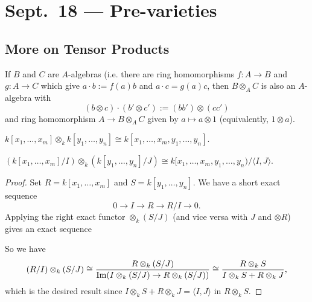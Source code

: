 \chapter{Sept.~18 --- Pre-varieties}

\section{More on Tensor Products}

\begin{prop}
  If $B$ and $C$ are $A$-algebras (i.e.
  there are ring homomorphisms
  $f : A \to B$ and $g : A \to C$ which
  give $a \cdot b := f(a) b$ and
  $a \cdot c = g(a) c$, then
  $B \otimes_A C$ is also an $A$-algebra
  with
  \[
    (b \otimes c) \cdot (b' \otimes c')
    := (bb') \otimes (cc')
  \]
  and ring homomorphism
  $A \to B \otimes_A C$ given by
  $a \mapsto a \otimes 1$ (equivalently,
  $1 \otimes a$).
\end{prop}

\begin{prop}
  $k[x_1, \dots, x_m] \otimes_k k[y_1, \dots, y_n] \cong k[x_1, \dots, x_m, y_1, \dots, y_n]$.
\end{prop}

\begin{prop}
  $(k[x_1, \dots, x_m] / I) \otimes_k (k[y_1, \dots, y_n] / J) \cong k[x_1, \dots, x_m, y_1, \dots, y_n) / \langle I, J \rangle$.
\end{prop}

\begin{proof}
  Set $R = k[x_1, \dots, x_m]$ and
  $S = k[y_1, \dots, y_n]$. We have a
  short exact sequence
  \[
    0 \longrightarrow
    I \longrightarrow R \longrightarrow R / I \longrightarrow 0.
  \]
  Applying the right exact
  functor $\otimes_k (S / J)$ (and
  vice versa with $J$ and $\otimes R$) gives
  an exact sequence
  \begin{center}
  \end{center}
  So we have
  \[
    (R / I) \otimes_k (S / J)
    \cong
    \frac{R \otimes_k (S / J)}
    {\operatorname{Im}(I \otimes_k (S / J) \to R \otimes_k (S / J))}
    \cong \frac{R \otimes_k S}{I \otimes_k S + R \otimes_k J},
  \]
  which is the desired result since
  $I \otimes_k S + R \otimes_k J = \langle I, J \rangle$
  in $R \otimes_k S$.
\end{proof}

